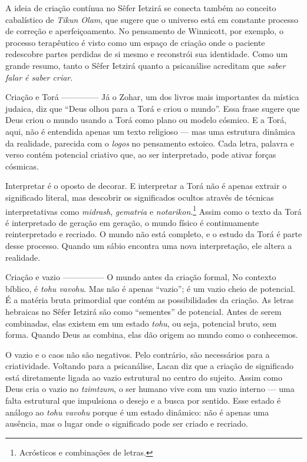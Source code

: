 A ideia de criação contínua no Sêfer Ietzirá se conecta também ao conceito cabalístico de \textit{Tikun Olam}, que sugere que o universo está em constante processo de correção e aperfeiçoamento. No pensamento de Winnicott, por exemplo, o processo terapêutico é visto como um espaço de criação onde o paciente redescobre partes perdidas de si mesmo e reconstrói sua identidade. Como um grande resumo, tanto o Sêfer Ietzirá quanto a psicanálise acreditam que \textit{saber falar é saber criar}.

Criação e Torá
--------------
Já o Zohar, um dos livros mais importantes da mística judaica, diz que ``Deus olhou para a Torá e criou o mundo''. Essa frase sugere que Deus criou o mundo usando a Torá como plano ou modelo cósmico. E a Torá, aqui, não é entendida apenas um texto religioso --- mas uma estrutura dinâmica da realidade, parecida com o \textit{logos} no pensamento estoico. Cada letra, palavra e verso contém potencial criativo que, ao ser interpretado, pode ativar forças cósmicas.

Interpretar é o oposto de decorar. E interpretar a Torá não é apenas extrair o significado literal, mas descobrir os significados ocultos através de técnicas interpretativas como \textit{midrash}, \textit{gematria} e \textit{notarikon}.\footnote{Acrósticos e combinações de letras.} Assim como o texto da Torá é interpretado de geração em geração, o mundo físico é continuamente reinterpretado e recriado. O mundo não está completo, e o estudo da Torá é parte desse processo. Quando um sábio encontra uma nova interpretação, ele altera a realidade.

Criação e vazio
---------------
O mundo antes da criação formal, No contexto bíblico, é \textit{tohu vavohu}. Mas não é apenas ``vazio''; é um vazio cheio de potencial. É a matéria bruta primordial que contém as possibilidades da criação. As letras hebraicas no Sêfer Ietzirá são como “sementes” de potencial. Antes de serem combinadas, elas existem em um estado \textit{tohu}, ou seja, potencial bruto, sem forma. Quando Deus as combina, elas dão origem ao mundo como o conhecemos.

O vazio e o caos não são negativos. Pelo contrário, são necessários para a criatividade. Voltando para a psicanálise, Lacan diz que a criação de significado está diretamente ligada ao vazio estrutural no centro do sujeito. Assim como Deus cria o vazio no \textit{tzimtzum}, o ser humano vive com um vazio interno --- uma falta estrutural que impulsiona o desejo e a busca por sentido. Esse estado é análogo ao \textit{tohu vavohu} porque é um estado dinâmico: não é apenas uma ausência, mas o lugar onde o significado pode ser criado e recriado.

